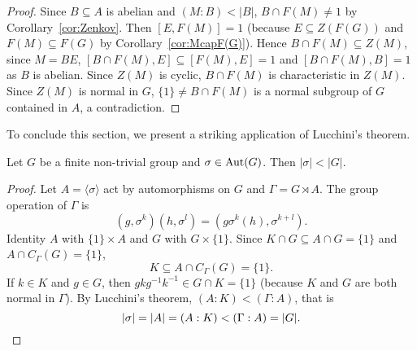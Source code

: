 \begin{proof}
	\medskip
	Since $B\subseteq A$ is abelian and $(M:B)<|B|$, $B\cap F(M)\ne1$ by Corollary~\ref{cor:Zenkov}. Then $[E,F(M)]=1$ (because $E\subseteq
	Z(F(G))$ and $F(M)\subseteq F(G)$ by Corollary~\ref{cor:McapF(G)}).
	Hence $B\cap F(M)\subseteq Z(M)$, since $M=BE$, $[B\cap F(M),E]\subseteq
	[F(M),E]=1$ and $[B\cap F(M),B]=1$ as $B$ is abelian. Since 
	$Z(M)$ is cyclic, $B\cap F(M)$ is characteristic in $Z(M)$. Since 
	$Z(M)$ is normal in $G$, $\{1\}\ne B\cap F(M)$ is a normal subgroup of $G$
	contained in $A$, a contradiction. 
\end{proof}

To conclude this section, we present a striking application of Lucchini's theorem.

\begin{corollary}[Horosevskii]
	Let $G$ be a finite non-trivial group and $\sigma\in\operatorname{Aut}(G)$. Then 
	$|\sigma|<|G|$.
\end{corollary}

\begin{proof}
	Let $A=\langle\sigma\rangle$ act by automorphisms on $G$ and 
	 $\Gamma=G\rtimes A$. The group operation of $\Gamma$ is 
	\[
	(g,\sigma^k)(h,\sigma^l)=(g\sigma^k(h),\sigma^{k+l}).
	\]
	Identity $A$ with $\{1\}\times A$ and $G$ with $G\times\{1\}$. 
	Since $K\cap G\subseteq A\cap G=\{1\}$ and $A\cap C_{\Gamma}(G)=\{1\}$, 
	\[
		K\subseteq A\cap C_{\Gamma}(G)=\{1\}.
	\]
	If $k\in K$ and $g\in G$, then $gkg^{-1}k^{-1}\in G\cap K=\{1\}$ (because
	$K$ and $G$ are both normal in $\Gamma$). By Lucchini's theorem, 
    $(A:K)<(\Gamma:A)$, that is
	\[
		|\sigma|=|A|=(A:K)<(\Gamma:A)=|G|.\qedhere
	\]
\end{proof}